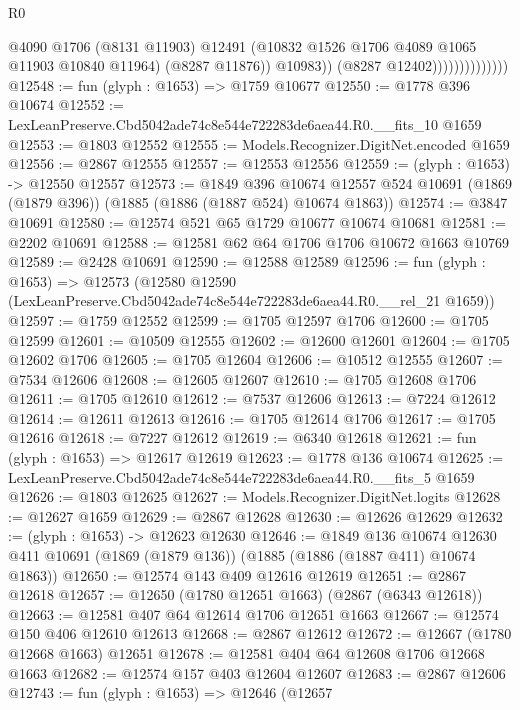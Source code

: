 \begin{lexlean}{R0}
\begin{coremodule}
                                    @4090
                                    @1706
                                    (@8131 @11903)
                                    @12491
                                    (@10832 @1526 @1706 @4089 @1065 @11903 @10840 @11964)
                                    (@8287 @11876))
                                  @10983))
                              (@8287 @12402))))))))))))))
@12548 := fun (glyph : @1653) => @1759 @10677
@12550 := @1778 @396 @10674
@12552 := LexLeanPreserve.Cbd5042ade74c8e544e722283de6aea44.R0.__fits_10 @1659
@12553 := @1803 @12552
@12555 := Models.Recognizer.DigitNet.encoded @1659
@12556 := @2867 @12555
@12557 := @12553 @12556
@12559 := (glyph : @1653) -> @12550 @12557
@12573 := @1849
    @396
    @10674
    @12557
    @524
    @10691
    (@1869 (@1879 @396))
    (@1885 (@1886 (@1887 @524) @10674 @1863))
@12574 := @3847 @10691
@12580 := @12574 @521 @65 @1729 @10677 @10674 @10681
@12581 := @2202 @10691
@12588 := @12581 @62 @64 @1706 @1706 @10672 @1663 @10769
@12589 := @2428 @10691
@12590 := @12588 @12589
@12596 := fun (glyph : @1653) =>
  @12573 (@12580 @12590 (LexLeanPreserve.Cbd5042ade74c8e544e722283de6aea44.R0.__rel_21 @1659))
@12597 := @1759 @12552
@12599 := @1705 @12597 @1706
@12600 := @1705 @12599
@12601 := @10509 @12555
@12602 := @12600 @12601
@12604 := @1705 @12602 @1706
@12605 := @1705 @12604
@12606 := @10512 @12555
@12607 := @7534 @12606
@12608 := @12605 @12607
@12610 := @1705 @12608 @1706
@12611 := @1705 @12610
@12612 := @7537 @12606
@12613 := @7224 @12612
@12614 := @12611 @12613
@12616 := @1705 @12614 @1706
@12617 := @1705 @12616
@12618 := @7227 @12612
@12619 := @6340 @12618
@12621 := fun (glyph : @1653) => @12617 @12619
@12623 := @1778 @136 @10674
@12625 := LexLeanPreserve.Cbd5042ade74c8e544e722283de6aea44.R0.__fits_5 @1659
@12626 := @1803 @12625
@12627 := Models.Recognizer.DigitNet.logits
@12628 := @12627 @1659
@12629 := @2867 @12628
@12630 := @12626 @12629
@12632 := (glyph : @1653) -> @12623 @12630
@12646 := @1849
    @136
    @10674
    @12630
    @411
    @10691
    (@1869 (@1879 @136))
    (@1885 (@1886 (@1887 @411) @10674 @1863))
@12650 := @12574 @143 @409 @12616 @12619
@12651 := @2867 @12618
@12657 := @12650 (@1780 @12651 @1663) (@2867 (@6343 @12618))
@12663 := @12581 @407 @64 @12614 @1706 @12651 @1663
@12667 := @12574 @150 @406 @12610 @12613
@12668 := @2867 @12612
@12672 := @12667 (@1780 @12668 @1663) @12651
@12678 := @12581 @404 @64 @12608 @1706 @12668 @1663
@12682 := @12574 @157 @403 @12604 @12607
@12683 := @2867 @12606
@12743 := fun (glyph : @1653) =>
  @12646
    (@12657

\end{coremodule}
\end{lexlean}
